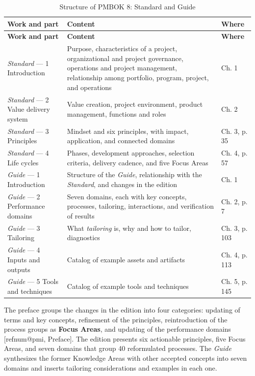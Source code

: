 \documentclass[11pt,a4paper]{article}
\makeatletter
\newcommand{\refnum}[1]{\csname refnum@#1\endcsname}
\newcommand{\cit}[1]{[\refnum{#1}]}
\newcommand{\SingleSpacing}{}
\newcommand{\fontetab}[1]{\par\vspace{3pt}{\small\noindent Source: #1\par}}
\makeatother
\begin{document}
\begingroup\SingleSpacing\small
\begin{longtable}{@{}>{\raggedright\arraybackslash}p{}>{\raggedright\arraybackslash}p{}>{\raggedright\arraybackslash}p{}@{}}
\caption{Structure of PMBOK 8: Standard and Guide}\label{tab:t1}\\
\toprule
\textbf{Work and part} & \textbf{Content} & \textbf{Where}\\
\midrule
\endfirsthead
\toprule
\textbf{Work and part} & \textbf{Content} & \textbf{Where}\\
\midrule
\endhead
\bottomrule
\endfoot
\bottomrule
\endlastfoot
\textit{Standard} — 1 Introduction & Purpose, characteristics of a project, organizational and project governance, operations and project management, relationship among portfolio, program, project, and operations & Ch. 1\\[3pt]
\textit{Standard} — 2 Value delivery system & Value creation, project environment, product management, functions and roles & Ch. 2\\[3pt]
\textit{Standard} — 3 Principles & Mindset and six principles, with impact, application, and connected domains & Ch. 3, p. 35\\[3pt]
\textit{Standard} — 4 Life cycles & Phases, development approaches, selection criteria, delivery cadence, and five Focus Areas & Ch. 4, p. 57\\[3pt]
\textit{Guide} — 1 Introduction & Structure of the \textit{Guide}, relationship with the \textit{Standard}, and changes in the edition & Ch. 1\\[3pt]
\textit{Guide} — 2 Performance domains & Seven domains, each with key concepts, processes, tailoring, interactions, and verification of results & Ch. 2, p. 7\\[3pt]
\textit{Guide} — 3 Tailoring & What \textit{tailoring} is, why and how to tailor, diagnostics & Ch. 3, p. 103\\[3pt]
\textit{Guide} — 4 Inputs and outputs & Catalog of example assets and artifacts & Ch. 4, p. 113\\[3pt]
\textit{Guide} — 5 Tools and techniques & Catalog of example tools and techniques & Ch. 5, p. 145\\[3pt]
\end{longtable}
\endgroup
\fontetab{Prepared by the authors (2026), based on \cit{pmi}.}

The preface groups the changes in the edition into four categories: updating of terms and key concepts, refinement of the principles, reintroduction of the process groups as \textbf{Focus Areas}, and updating of the performance domains [\refnum{pmi}, Preface]. The edition presents six actionable principles, five Focus Areas, and seven domains that group 40 reformulated processes. The \textit{Guide} synthesizes the former Knowledge Areas with other accepted concepts into seven domains and inserts tailoring considerations and examples in each one.
\end{document}
